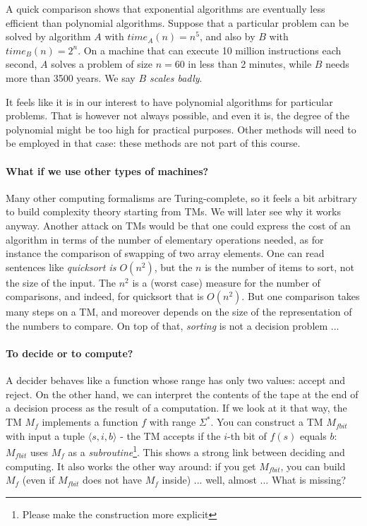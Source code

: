 A quick comparison shows that exponential algorithms are eventually
less efficient than polynomial algorithms. Suppose that a particular
problem can be solved by algorithm $A$ with $time_A(n)=n^5$, and also
by $B$ with $time_B(n)=2^n$. On a machine that can execute 10 million
instructions each second, $A$ solves a problem of size $n=60$ in
less than 2 minutes, while $B$ needs more than 3500 years. We say {\em
$B$ scales badly}.

It feels like it is in our interest to have polynomial algorithms for
particular problems. That is however not always possible, and even it
is, the degree of the polynomial might be too high for practical
purposes. Other methods will need to be employed in that case: these
methods are not part of this course.



\paragraph{What if we use other types of machines?} Many other
computing formalisms are Turing-complete, so it feels a bit arbitrary
to build complexity theory starting from TMs. We will later see why it
works anyway. Another attack on TMs would be that one could express
the cost of an algorithm in terms of the number of elementary
operations needed, as for instance the comparison of swapping of two
array elements. One can read sentences like {\em quicksort is
$O(n^2)$}, but the $n$ is the number of items to sort, not the size of
the input. The $n^2$ is a (worst case) measure for the number of
comparisons, and indeed, for quicksort that is $O(n^2)$. But one
comparison takes many steps on a TM, and moreover depends on the size
of the representation of the numbers to compare. On top of that, {\em
sorting} is not a decision problem ...


\paragraph{To decide or to compute?}

A decider behaves like a function whose range has only two values:
accept and reject. On the other hand, we can interpret the contents
of the tape at the end of a decision process as the result of a
computation. If we look at it that way, the TM $M_f$ implements a
function $f$ with range $\Sigma^*$. You can construct a TM $M_{fbit}$
with input a tuple $\langle s,i,b \rangle$ - the TM accepts if the
$i$-th bit of $f(s)$ equals $b$: $M_{fbit}$ uses $M_f$ as a {\em
subroutine}\footnote{Please make the construction more explicit}. This
shows a strong link between deciding and computing. It also works the
other way around: if you get $M_{fbit}$, you can build $M_f$ (even if
$M_{fbit}$ does not have $M_f$ inside) ... well, almost ... What is
missing?


